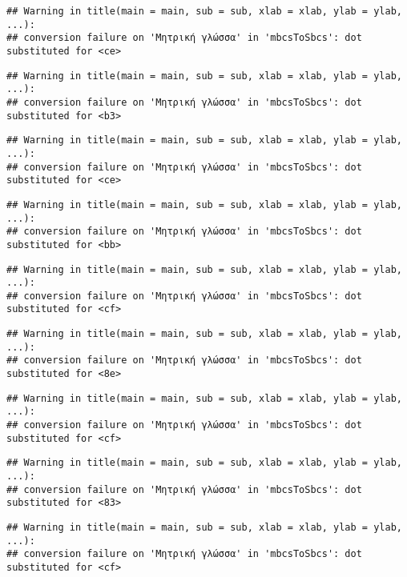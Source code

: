\documentclass[
]{article}
\begin{document}
\begin{verbatim}
## Warning in title(main = main, sub = sub, xlab = xlab, ylab = ylab, ...):
## conversion failure on 'Μητρική γλώσσα' in 'mbcsToSbcs': dot substituted for <ce>
\end{verbatim}

\begin{verbatim}
## Warning in title(main = main, sub = sub, xlab = xlab, ylab = ylab, ...):
## conversion failure on 'Μητρική γλώσσα' in 'mbcsToSbcs': dot substituted for <b3>
\end{verbatim}

\begin{verbatim}
## Warning in title(main = main, sub = sub, xlab = xlab, ylab = ylab, ...):
## conversion failure on 'Μητρική γλώσσα' in 'mbcsToSbcs': dot substituted for <ce>
\end{verbatim}

\begin{verbatim}
## Warning in title(main = main, sub = sub, xlab = xlab, ylab = ylab, ...):
## conversion failure on 'Μητρική γλώσσα' in 'mbcsToSbcs': dot substituted for <bb>
\end{verbatim}

\begin{verbatim}
## Warning in title(main = main, sub = sub, xlab = xlab, ylab = ylab, ...):
## conversion failure on 'Μητρική γλώσσα' in 'mbcsToSbcs': dot substituted for <cf>
\end{verbatim}

\begin{verbatim}
## Warning in title(main = main, sub = sub, xlab = xlab, ylab = ylab, ...):
## conversion failure on 'Μητρική γλώσσα' in 'mbcsToSbcs': dot substituted for <8e>
\end{verbatim}

\begin{verbatim}
## Warning in title(main = main, sub = sub, xlab = xlab, ylab = ylab, ...):
## conversion failure on 'Μητρική γλώσσα' in 'mbcsToSbcs': dot substituted for <cf>
\end{verbatim}

\begin{verbatim}
## Warning in title(main = main, sub = sub, xlab = xlab, ylab = ylab, ...):
## conversion failure on 'Μητρική γλώσσα' in 'mbcsToSbcs': dot substituted for <83>
\end{verbatim}

\begin{verbatim}
## Warning in title(main = main, sub = sub, xlab = xlab, ylab = ylab, ...):
## conversion failure on 'Μητρική γλώσσα' in 'mbcsToSbcs': dot substituted for <cf>
\end{verbatim}
\end{document}
